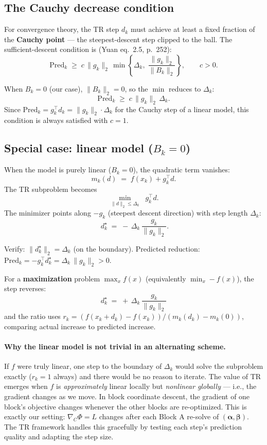 \documentclass[11pt,a4paper]{article}
\begin{document}
\subsection{The Cauchy decrease condition}

For convergence theory, the TR step $d_k$ must achieve at least a fixed fraction of the \textbf{Cauchy point} --- the steepest-descent step clipped to the ball. The sufficient-descent condition is (Yuan eq.\ 2.5, p.\ 252):
\begin{equation}
\boxed{\;
\text{Pred}_k \;\ge\; c\,\|g_k\|_2\,\min\!\left\{\Delta_k,\;\frac{\|g_k\|_2}{\|B_k\|_2}\right\},\qquad c > 0.
\;}
\tag{Yuan, eq.\ 2.5}
\end{equation}

When $B_k = 0$ (our case), $\|B_k\|_2 = 0$, so the $\min$ reduces to $\Delta_k$:
\[
\text{Pred}_k \;\ge\; c\,\|g_k\|_2\,\Delta_k.
\]
Since $\text{Pred}_k = g_k^\top d_k = \|g_k\|_2 \cdot \Delta_k$ for the Cauchy step of a linear model, this condition is always satisfied with $c = 1$.

\subsection{Special case: linear model ($B_k = 0$)}

When the model is purely linear ($B_k = 0$), the quadratic term vanishes:
\[
m_k(d) \;=\; f(x_k) + g_k^\top d.
\]
The TR subproblem becomes
\[
\min_{\|d\|_2 \le \Delta_k}\;\; g_k^\top d.
\]
The minimizer points along $-g_k$ (steepest descent direction) with step length $\Delta_k$:
\begin{equation}
\boxed{\;d_k^\star \;=\; -\,\Delta_k\,\frac{g_k}{\|g_k\|_2}.}
\tag{Cauchy step, linear model}
\end{equation}

Verify: $\|d_k^\star\|_2 = \Delta_k$ (on the boundary). Predicted reduction: $\text{Pred}_k = -g_k^\top d_k^\star = \Delta_k\,\|g_k\|_2 > 0$.

For a \textbf{maximization} problem $\max_x f(x)$ (equivalently $\min_x -f(x)$), the step reverses:
\[
d_k^\star \;=\; +\,\Delta_k\,\frac{g_k}{\|g_k\|_2}
\]
and the ratio uses $r_k = (f(x_k + d_k) - f(x_k))/(m_k(d_k) - m_k(0))$, comparing actual increase to predicted increase.

\paragraph{Why the linear model is not trivial in an alternating scheme.} If $f$ were truly linear, one step to the boundary of $\Delta_k$ would solve the subproblem exactly ($r_k = 1$ always) and there would be no reason to iterate. The value of TR emerges when $f$ is \emph{approximately} linear locally but \emph{nonlinear globally} --- i.e., the gradient changes as we move. In block coordinate descent, the gradient of one block's objective changes whenever the other blocks are re-optimized. This is exactly our setting: $\nabla_C \Phi = L$ changes after each Block A re-solve of $(\boldsymbol\alpha,\boldsymbol\beta)$. The TR framework handles this gracefully by testing each step's prediction quality and adapting the step size.
\end{document}
